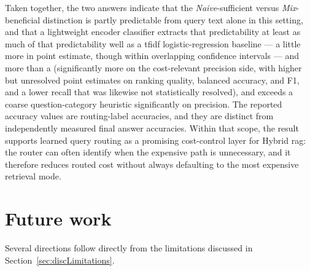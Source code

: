 \documentclass[english, bibtex]{kththesis}               %
\numberwithin{listing}{chapter}
\providecommand{\DIFaddtex}[1]{{\protect\color{blue} \sf #1}} %
\providecommand{\DIFdeltex}[1]{{\protect\color{red} \scriptsize #1}} %
\providecommand{\DIFaddbegin}{} %
\providecommand{\DIFaddend}{} %
\providecommand{\DIFdelbegin}{} %
\providecommand{\DIFdelend}{} %
\providecommand{\DIFadd}[1]{\texorpdfstring{\DIFaddtex{#1}}{#1}} %
\providecommand{\DIFdel}[1]{\texorpdfstring{\DIFdeltex{#1}}{}} %
\begin{document}
Taken together, the two answers indicate that the \emph{Naive}-sufficient versus \emph{Mix}-beneficial distinction is partly predictable from query text alone in this setting, and that a lightweight encoder classifier extracts \DIFaddbegin \DIFadd{that predictability }\DIFaddend at least as \DIFdelbegin \DIFdel{much of that predictability }\DIFdelend \DIFaddbegin \DIFadd{well }\DIFaddend as a \gls{tfidf} logistic-regression baseline \DIFdelbegin \DIFdel{--- a little more in point estimate, though within overlapping confidence intervals --- and more than a }\DIFdelend \DIFaddbegin \DIFadd{(significantly more on the cost-relevant precision side, with higher but unresolved point estimates on ranking quality, balanced accuracy, and F1, and a lower recall that was likewise not statistically resolved), and exceeds a }\DIFaddend coarse question-category heuristic \DIFaddbegin \DIFadd{significantly on precision}\DIFaddend . The reported accuracy values are routing-label accuracies, and they are distinct from independently measured final answer accuracies. Within that scope, the result supports learned query routing as a promising cost-control layer for Hybrid \gls{rag}: the router can often identify when the expensive path is unnecessary, and it therefore reduces routed cost without always defaulting to the most expensive retrieval mode.

\DIFdelbegin %
\DIFdelend \DIFaddbegin \section{Future work}
\label{sec:futureWork}
\DIFaddend 

\DIFdelbegin %
\DIFdelend \DIFaddbegin \DIFadd{Several directions follow directly from the limitations discussed in Section~\ref{sec:discLimitations}.
}\DIFaddend 
\end{document}
